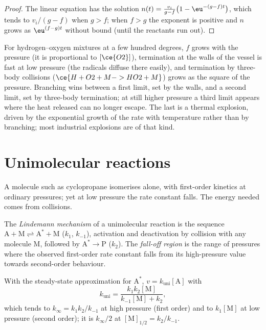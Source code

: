 \begin{proof}
The linear equation has the solution $n(t) = \frac{v_i}{g - f}\bigl(1 - \eu^{-(g - f)t}\bigr)$, which
tends to $v_i/(g - f)$ when $g > f$; when $f > g$ the exponent is positive and $n$
grows as $\eu^{(f - g)t}$ without bound (until the reactants run out).
\end{proof}

For hydrogen--oxygen mixtures at a few hundred degrees, $f$ grows with the
pressure (it is proportional to $[\ce{O2}]$), termination at the walls of the
vessel is fast at low pressure (the radicals diffuse there easily), and
termination by three-body collisions ($\ce{H + O2 + M -> HO2 + M}$) grows as the square
of the pressure. Branching wins between a first limit, set by the walls, and a
second limit, set by three-body termination; at still higher pressure a third
limit appears where the heat released can no longer escape. The last is a
thermal explosion, driven by the exponential growth of the rate with
temperature rather than by branching; most industrial explosions are of that
kind.

\section{Unimolecular reactions}

A molecule such as cyclopropane isomerises alone, with first-order kinetics at
ordinary pressures; yet at low pressure the rate constant falls. The energy
needed comes from collisions.

\begin{definition}\label{def:b3:complex-kinetics:lindemann}
The \emph{Lindemann mechanism} of a unimolecular
reaction is the sequence $\mathrm{A + M \rightleftharpoons A^* + M}$ ($k_1$, $k_{-1}$), activation and
deactivation by collision with any molecule M, followed by $\mathrm{A^* \to P}$ ($k_2$). The
\emph{fall-off region} is the range of pressures where the
observed first-order rate constant falls from its high-pressure value towards
second-order behaviour.
\end{definition}

\begin{theorem}\label{thm:b3:complex-kinetics:lindemann}
With the steady-state approximation for $\mathrm{A^*}$, $v = k_{\mathrm{uni}}[\mathrm A]$ with
\[
  k_{\mathrm{uni}} = \frac{k_1k_2[\mathrm M]}{k_{-1}[\mathrm M] + k_2},
\]
which tends to $k_\infty = k_1k_2/k_{-1}$ at high pressure (first order) and to $k_1[\mathrm M]$ at
low pressure (second order); it is $k_\infty/2$ at $[\mathrm M]_{1/2} = k_2/k_{-1}$.
\end{theorem}

